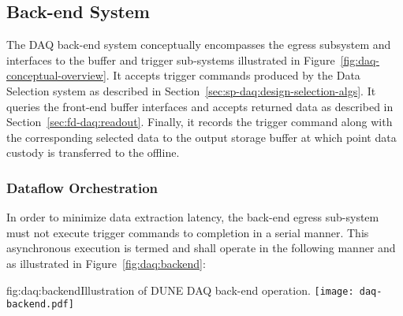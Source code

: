 
 



\subsection{Back-end System}
\label{sec:fd-daq:design-backend}

The DAQ back-end system conceptually encompasses the egress subsystem and interfaces to the buffer and trigger sub-systems illustrated in Figure~\ref{fig:daq-conceptual-overview}. 
It accepts trigger commands produced by the Data Selection system as described in Section~\ref{sec:sp-daq:design-selection-algs}. 
It queries the front-end buffer interfaces and accepts returned data as described in Section~\ref{sec:fd-daq:readout}. 
Finally, it records the trigger command along with the corresponding selected data to the output storage buffer at which point data custody is transferred to the offline.

\subsubsection{Dataflow Orchestration}

In order to minimize data extraction latency, the back-end egress sub-system must not execute trigger commands to completion in a serial manner. 
This asynchronous execution is termed  and shall operate in the following manner and as illustrated in Figure~\ref{fig:daq:backend}:

\begin{dunefigure}{fig:daq:backend}{Illustration of DUNE DAQ back-end operation.}
  \texttt{[image: daq-backend.pdf]}
\end{dunefigure}

